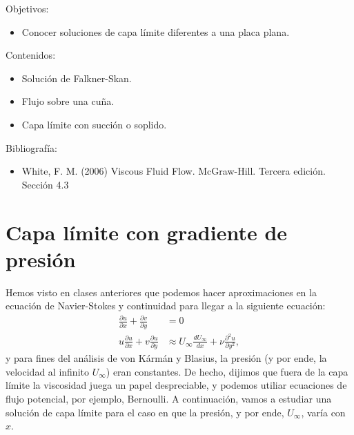 \begin{framed}

Objetivos:
\begin{itemize}
    \item Conocer soluciones de capa límite diferentes a una placa plana. 
\end{itemize}

Contenidos:
\begin{itemize}
    \item Solución de Falkner-Skan. 
    \item Flujo sobre una cuña. 
    \item Capa límite con succión o soplido. 
\end{itemize}

Bibliografía:
\begin{itemize}
    \item White, F. M. (2006) Viscous Fluid Flow. McGraw-Hill. Tercera edición. Sección 4.3
\end{itemize}
\end{framed}

\section*{Capa límite con gradiente de presión}

Hemos visto en clases anteriores que podemos hacer aproximaciones en la ecuación de Navier-Stokes y continuidad para llegar a la siguiente ecuación:
%
\begin{align}\label{eq:NS_capa_x10}
\frac{\partial u}{\partial x} + \frac{\partial v}{\partial y} &= 0 \nonumber\\
u\frac{\partial u}{\partial x} + v\frac{\partial u}{\partial y} &\approx U_\infty \frac{dU_\infty}{dx} + \nu \frac{\partial^2u}{\partial y^2},
\end{align}
%
y para fines del análisis de von Kármán y Blasius, la presión (y por ende, la velocidad al infinito $U_\infty$) eran constantes. 
De hecho, dijimos que fuera de la capa límite la viscosidad juega un papel despreciable, y podemos utiliar ecuaciones de flujo potencial, por ejemplo, Bernoulli.
A continuación, vamos a estudiar una solución de capa límite para el caso en que la presión, y por ende, $U_\infty$, varía con $x$.

